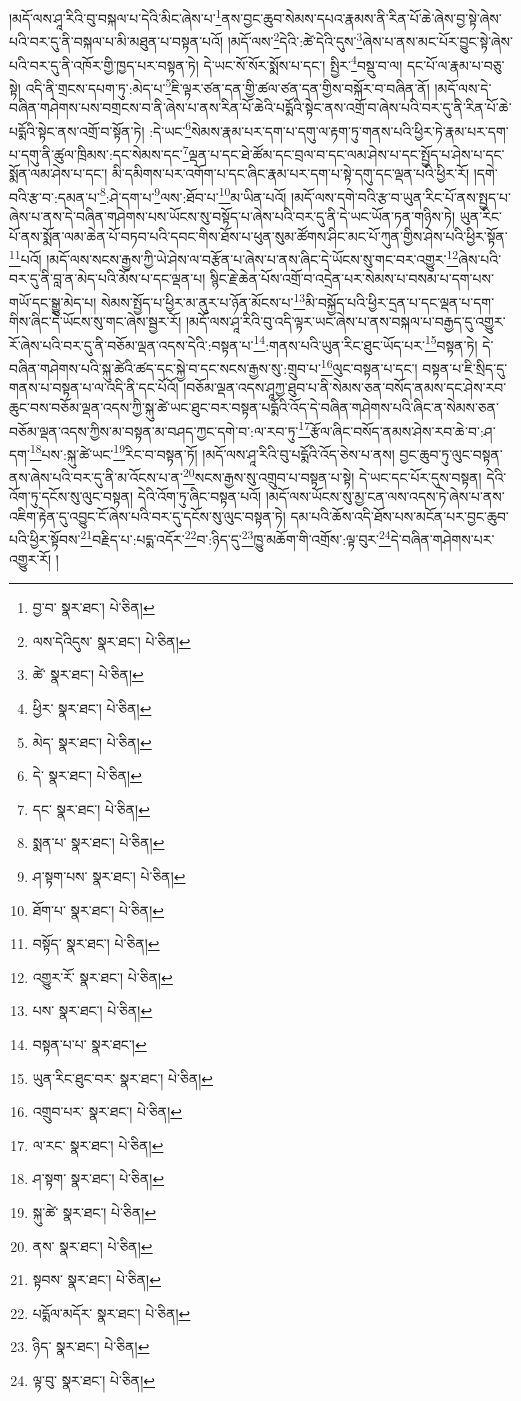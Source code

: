 །མདོ་ལས་ཤཱ་རིའི་བུ་བསྐལ་པ་དེའི་མིང་ཞེས་པ་\footnote{བྱ་བ་  སྣར་ཐང་།  པེ་ཅིན། }ནས་བྱང་ཆུབ་སེམས་དཔའ་རྣམས་ནི་རིན་པོ་ཆེ་ཞེས་བྱ་སྟེ་ཞེས་པའི་བར་དུ་ནི་བསྐལ་པ་མི་མཐུན་པ་བསྟན་པའོ། །མདོ་ལས་\footnote{ལས་དེའིདུས་  སྣར་ཐང་།  པེ་ཅིན། }དེའི་:ཚེ་དེའི་དུས་\footnote{ཚེ་  སྣར་ཐང་།  པེ་ཅིན། }ཞེས་པ་ནས་མང་པོར་བྱུང་སྟེ་ཞེས་པའི་བར་དུ་ནི་འཁོར་གྱི་ཁྱད་པར་བསྟན་ཏེ། དེ་ཡང་སོ་སོར་སྨོས་པ་དང་། སྤྱིར་\footnote{ཕྱིར་  སྣར་ཐང་།  པེ་ཅིན། }བསྡུ་བ་ལ། དང་པོ་ལ་རྣམ་པ་བཅུ་སྟེ། འདི་ནི་གྲངས་དཔག་ཏུ་:མེད་པ་\footnote{མེད་  སྣར་ཐང་།  པེ་ཅིན། }ཇི་ལྟར་ཙན་དན་གྱི་ཚལ་ཙན་དན་གྱིས་བསྐོར་བ་བཞིན་ནོ། །མདོ་ལས་དེ་བཞིན་གཤེགས་པས་བགྲངས་བ་ནི་ཞེས་པ་ནས་རིན་པོ་ཆེའི་པདྨོའི་སྟེང་ནས་འགྲོ་བ་ཞེས་པའི་བར་དུ་ནི་རིན་པོ་ཆེ་པདྨོའི་སྟེང་ནས་འགྲོ་བ་སྟོན་ཏེ། :དེ་ཡང་\footnote{དེ་  སྣར་ཐང་།  པེ་ཅིན། }སེམས་རྣམ་པར་དག་པ་དགུ་ལ་རྟག་ཏུ་གནས་པའི་ཕྱིར་ཏེ་རྣམ་པར་དག་པ་དགུ་ནི་ཚུལ་ཁྲིམས་:དང་སེམས་དང་\footnote{དང་  སྣར་ཐང་།  པེ་ཅིན། }ལྡན་པ་དང་ཐེ་ཚོམ་དང་བྲལ་བ་དང་ལམ་ཤེས་པ་དང་སྤྱོད་པ་ཤེས་པ་དང་སྨོན་ལམ་ཤེས་པ་དང་། མི་དམིགས་པར་འགོག་པ་དང་ཞིང་རྣམ་པར་དག་པ་སྟེ་དགུ་དང་ལྡན་པའི་ཕྱིར་རོ། །དགེ་བའི་རྩ་བ་:དམན་པ་\footnote{སྨན་པ་  སྣར་ཐང་།  པེ་ཅིན། }:ཤེ་དག་པ་\footnote{ཤ་སྟག་པས་  སྣར་ཐང་།  པེ་ཅིན། }ལས་:ཐོབ་པ་\footnote{ཐོག་པ་  སྣར་ཐང་།  པེ་ཅིན། }མ་ཡིན་པའོ། །མདོ་ལས་དགེ་བའི་རྩ་བ་ཡུན་རིང་པོ་ནས་སྤྱད་པ་ཞེས་པ་ནས་དེ་བཞིན་གཤེགས་པས་ཡོངས་སུ་བསྟོད་པ་ཞེས་པའི་བར་དུ་ནི་དེ་ཡང་ཡོན་ཏན་གཉིས་ཏེ། ཡུན་རིང་པོ་ནས་སྨོན་ལམ་ཆེན་པོ་བཏབ་པའི་དབང་གིས་ཐོས་པ་ཕུན་སུམ་ཚོགས་ཤིང་མང་པོ་ཀུན་གྱིས་ཤེས་པའི་ཕྱིར་སྟོན་\footnote{བསྟོད་  སྣར་ཐང་།  པེ་ཅིན། }པའོ། །མདོ་ལས་སངས་རྒྱས་ཀྱི་ཡེ་ཤེས་ལ་བརྩོན་པ་ཞེས་པ་ནས་ཞིང་དེ་ཡོངས་སུ་གང་བར་འགྱུར་\footnote{འགྱུར་རོ་  སྣར་ཐང་།  པེ་ཅིན། }ཞེས་པའི་བར་དུ་ནི་བླ་ན་མེད་པའི་མོས་པ་དང་ལྡན་པ། སྙིང་རྗེ་ཆེན་པོས་འགྲོ་བ་འདྲེན་པར་སེམས་པ་བསམ་པ་དག་པས་གཡོ་དང་སྒྱུ་མེད་པ། སེམས་སྤྱོད་པ་ཕྱིར་མ་ནུར་པ་ཉོན་མོངས་པ་\footnote{པས་  སྣར་ཐང་།  པེ་ཅིན། }མི་བསྐྱོད་པའི་ཕྱིར་དྲན་པ་དང་ལྡན་པ་དག་གིས་ཞིང་དེ་ཡོངས་སུ་གང་ཞེས་སྦྱར་རོ། །མདོ་ལས་ཤཱ་རིའི་བུ་འདི་ལྟར་ཡང་ཞེས་པ་ནས་བསྐལ་པ་བརྒྱད་དུ་འགྱུར་རོ་ཞེས་པའི་བར་དུ་ནི་བཅོམ་ལྡན་འདས་དེའི་:བསྟན་པ་\footnote{བསྟན་པ་པ་  སྣར་ཐང་། }:གནས་པའི་ཡུན་རིང་ཐུང་ཡོད་པར་\footnote{ཡུན་རིང་ཐུང་བར་  སྣར་ཐང་།  པེ་ཅིན། }བསྟན་ཏེ། དེ་བཞིན་གཤེགས་པའི་སྐུ་ཚེའི་ཚད་དང་སྐྱེ་བ་དང་སངས་རྒྱས་སུ་:གྲུབ་པ་\footnote{འགྲུབ་པར་  སྣར་ཐང་།  པེ་ཅིན། }ལུང་བསྟན་པ་དང་། བསྟན་པ་ཇི་སྲིད་དུ་གནས་པ་བསྟན་པ་ལ་འདི་ནི་དང་པོའོ། །བཅོམ་ལྡན་འདས་ཤཱཀྱ་ཐུབ་པ་ནི་སེམས་ཅན་བསོད་ནམས་དང་ཤེས་རབ་ཆུང་བས་བཅོམ་ལྡན་འདས་ཀྱི་སྐུ་ཚེ་ཡང་ཐུང་བར་བསྟན་པདྨོའི་འོད་དེ་བཞིན་གཤེགས་པའི་ཞིང་ན་སེམས་ཅན་བཅོམ་ལྡན་འདས་ཀྱིས་མ་བསྟན་མ་བཤད་ཀྱང་དགེ་བ་:ལ་རབ་ཏུ་\footnote{ལ་རང་  སྣར་ཐང་།  པེ་ཅིན། }རྩོལ་ཞིང་བསོད་ནམས་ཤེས་རབ་ཆེ་བ་:ཤ་དག་\footnote{ཤ་སྟག་  སྣར་ཐང་།  པེ་ཅིན། }པས་:སྐུ་ཚེ་ཡང་\footnote{སྐུ་ཚེ་  སྣར་ཐང་།  པེ་ཅིན། }རིང་བ་བསྟན་ཏོ། །མདོ་ལས་ཤཱ་རིའི་བུ་པདྨོའི་འོད་ཅེས་པ་ནས། བྱང་ཆུབ་ཏུ་ལུང་བསྟན་ནས་ཞེས་པའི་བར་དུ་ནི་མ་འོངས་པ་ན་\footnote{ནས་  སྣར་ཐང་།  པེ་ཅིན། }སངས་རྒྱས་སུ་འགྲུབ་པ་བསྟན་པ་སྟེ། དེ་ཡང་དང་པོར་དུས་བསྟན། དེའི་འོག་ཏུ་དངོས་སུ་ལུང་བསྟན། དེའི་འོག་ཏུ་ཞིང་བསྟན་པའོ། །མདོ་ལས་ཡོངས་སུ་མྱ་ངན་ལས་འདས་ཏེ་ཞེས་པ་ནས་འཇིག་རྟེན་དུ་འབྱུང་ངོ་ཞེས་པའི་བར་དུ་དངོས་སུ་ལུང་བསྟན་ཏེ། དམ་པའི་ཆོས་འདི་ཐོས་པས་མངོན་པར་བྱང་ཆུབ་པའི་ཕྱིར་སྟོབས་\footnote{སྟབས་  སྣར་ཐང་།  པེ་ཅིན། }བརྗིད་པ་:པདྨ་འདོར་\footnote{པདྨོལ་མདོར་  སྣར་ཐང་།  པེ་ཅིན། }བ་:ཉིད་དུ་\footnote{ཉིད་  སྣར་ཐང་།  པེ་ཅིན། }ཁྱུ་མཆོག་གི་འགྲོས་:ལྟ་བུར་\footnote{ལྟ་བུ་  སྣར་ཐང་།  པེ་ཅིན། }དེ་བཞིན་གཤེགས་པར་འགྱུར་རོ། །
